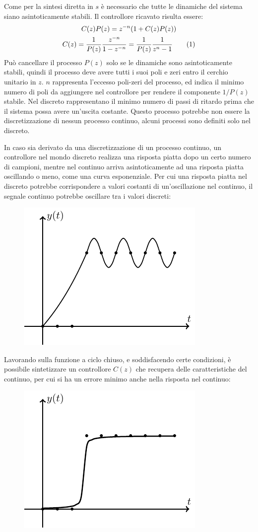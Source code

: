 \documentclass{article}
\numberwithin{equation}{subsection}
\newcommand{\tageq}{\tag{\stepcounter{equation}\theequation}}
\begin{document}
Come per la sintesi diretta in $s$ è necessario che tutte le dinamiche del sistema siano asintoticamente stabili. Il controllore ricavato risulta essere:
\begin{gather*}
    C(z)P(z)=z^{-n}(1+C(z)P(z))\\
    C(z)=\displaystyle\frac{1}{P(z)}\frac{z^{-n}}{1-z^{-n}}=\frac{1}{P(z)}\frac{1}{z^n-1}\tageq
\end{gather*}
Può cancellare il processo $P(z)$ solo se le dinamiche sono asintoticamente stabili, quindi il processo deve avere tutti i suoi poli e zeri entro il cerchio 
unitario in $z$. 
$n$ rappresenta l'eccesso poli-zeri del processo, ed indica il minimo numero di poli da aggiungere nel controllore per rendere il componente ${1}/{P(z)}$ stabile. 
Nel discreto rappresentano il minimo numero di passi di ritardo prima che il sistema possa avere un'uscita costante. Questo processo potrebbe non essere la 
discretizzazione di nessun processo continuo, alcuni processi sono definiti solo nel discreto. 

In caso sia derivato da una discretizzazione di un processo continuo, un controllore nel mondo discreto realizza una risposta piatta dopo 
un certo numero di campioni, mentre nel continuo arriva asintoticamente ad una risposta piatta oscillando o meno, come una curva esponenziale. Per cui una risposta 
piatta nel discreto potrebbe corrispondere a valori costanti di un'oscillazione nel continuo, il segnale continuo potrebbe oscillare tra i valori discreti: 

\begin{figure}[H]%
    \centering
    \includegraphics{risposta-discreta-2.pdf}%
\end{figure}

Lavorando sulla funzione a ciclo chiuso, e soddisfacendo certe condizioni, è possibile sintetizzare un controllore $C(z)$ che recupera delle caratteristiche del continuo, 
per cui si ha un errore minimo anche nella risposta nel continuo: 

\begin{figure}[H]%
    \centering
    \includegraphics{risposta-discreta-3.pdf}%
\end{figure}
\end{document}

